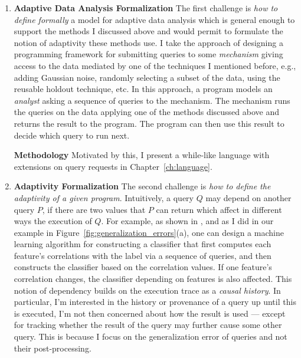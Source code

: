 \begin{enumerate}
 \item
 \textbf{Adaptive Data Analysis Formalization}
The first challenge is \emph{how to define formally} a model for adaptive data analysis which is general enough to support the methods I discussed above and would permit to formulate the notion of adaptivity these methods use. 
I take the approach of designing a programming framework for submitting queries to some \emph{mechanism} giving access to the data mediated by one of the techniques I mentioned before, e.g., adding Gaussian noise, randomly selecting a subset of the data, using the reusable holdout technique, etc. 
In this approach, a program models an \emph{analyst} asking a sequence of queries to the mechanism. The mechanism runs the queries on the data applying one of the methods discussed above and returns the result to the program. The program can then use this result to decide which query to run next. 

\textbf{Methodology}
Motivated by this, I present a while-like language with extensions on query requests in Chapter~\ref{ch:language}.

\item 
\textbf{Adaptivity Formalization}
The second challenge is \emph{how to define the adaptivity of a given program}.
Intuitively, a query $Q$ may depend on another query $P$, if there are two values that $P$ can return which affect in different ways the execution of $Q$. 
For example, as shown in \cite{dwork2015reusable}, and as I did in our example in Figure~\ref{fig:generalization_errors}(a), one can design a machine learning algorithm for constructing a classifier that first computes each feature's correlations with the label via a sequence of queries, and then constructs the classifier based on the correlation values. 
If one feature's correlation changes, the classifier depending on features is also affected. 
This notion of dependency builds on the execution trace as a \emph{causal history}. 
In particular, I'm interested in the history or provenance of a query up until this is executed, I'm not then concerned about how the result is used --- except for tracking whether the result of the query may further cause some other query. 
This is because I focus on the generalization error of queries and not their post-processing. %


\end{enumerate}
